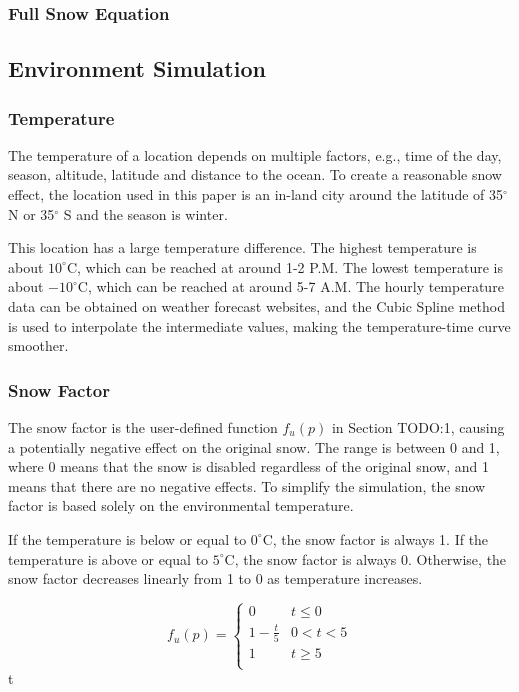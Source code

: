 \documentclass{article}
\begin{document}
\begin{itemize}
\subsubsection {Full Snow Equation}

\subsection {Environment Simulation}

\subsubsection {Temperature}
The temperature of a location depends on multiple factors, e.g., time of the day, season, altitude, 
latitude and distance to the ocean. To create a reasonable snow effect, the location used in this paper 
is an in-land city around the latitude of 35$^{\circ}$ N or 35$^{\circ}$ S and the season is winter.

This location has a large temperature difference. The highest temperature is about 
\(10^\circ\mathrm{C}\), which can be reached at around 1-2 P.M. The lowest temperature is about 
\(-10^\circ\mathrm{C}\), which can be reached at around 5-7 A.M. The hourly temperature data can be
obtained on weather forecast websites, and the Cubic Spline method is used to interpolate the 
intermediate values, making the temperature-time curve smoother.

\subsubsection {Snow Factor}
The snow factor is the user-defined function \( f_{u}(p) \) in Section TODO:1, causing a potentially 
negative effect on the original snow. The range is between 0 and 1, where 0 means that the snow is 
disabled regardless of the original snow, and 1 means that there are no negative effects.
To simplify the simulation, the snow factor is based solely on the environmental temperature. 

If the temperature is below or equal to \(0^\circ\mathrm{C}\), the snow factor is always 1. 
If the temperature is above or equal to \(5^\circ\mathrm{C}\), the snow factor is always 0. 
Otherwise, the snow factor decreases linearly from 1 to 0 as temperature increases.

\[
  f_{u}(p)=
  \left\{
    \begin{array}{ll}
      0 & t\leq 0 \\
      1 - \frac{t}{5} &  0 < t < 5 \\
      1 & t\geq 5 \\
    \end{array} 
  \right. 
\]
 t 


\end{itemize}
\end{document}
